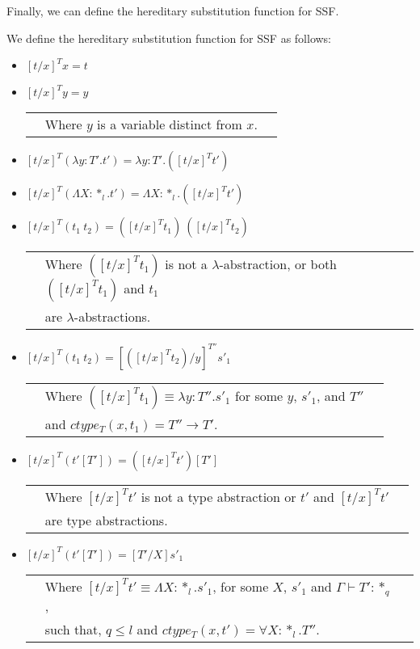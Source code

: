 \noindent
Finally, we can define the hereditary substitution function for SSF.
\begin{definition}
  \label{def:hereditary_substitution_ssf}
  We define the hereditary substitution function for SSF as follows:
  \begin{itemize}
  \item[] $[t/x]^T x = t$
  \item[] $[t/x]^T y = y$\\
    \begin{tabular}{lll}
      & Where $y$ is a variable distinct from $x$.\\
    \end{tabular}
  \item[] $[t/x]^T (\lambda y:T'.t') = \lambda y:T'.([t/x]^T t')$
  \item[] $[t/x]^T (\Lambda X:*_l.t') = \Lambda X:*_l.([t/x]^T t')$
  \item[] $[t/x]^T (t_1\ t_2) = ([t/x]^T t_1)\ ([t/x]^T t_2)$\\
    \begin{tabular}{lll}
      & Where $([t/x]^T t_1)$ is not a $\lambda$-abstraction, or both $([t/x]^T t_1)$ and $t_1$\\
      & are $\lambda$-abstractions.
    \end{tabular}
  \item[] $[t/x]^{T} (t_1\ t_2) = [([t/x]^{T} t_2)/y]^{T''} s'_1$\\
    \begin{tabular}{lll}
      & Where $([t/x]^{T} t_1) \equiv \lambda y:T''.s'_1$ for some $y$, $s'_1$, and $T''$ \\
      & and $ctype_T(x,t_1) = T'' \to T'$.
    \end{tabular}
  \item[] $[t/x]^T (t'[T']) = ([t/x]^T t')[T']$\\
    \begin{tabular}{lll}
      & Where $[t/x]^T t'$ is not a type abstraction or $t'$ and $[t/x]^T t'$ \\
      & are type abstractions.
    \end{tabular}
    \item[] $[t/x]^{T} (t'[T']) = [T'/X]s'_1$\\
      \begin{tabular}{lll}
        & Where $[t/x]^{T} t' \equiv \Lambda X:*_l.s'_1$, for some $X$, $s'_1$ and $\Gamma \vdash T':*_q$, \\
        & such that, $q \leq l$ and $ctype_T(x,t') = \forall X:*_l.T''$.
      \end{tabular}
  \end{itemize}
\end{definition}

